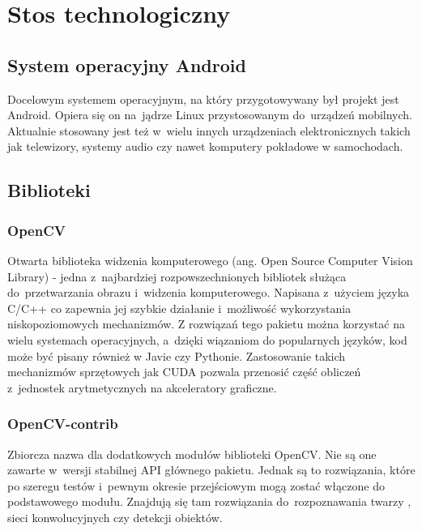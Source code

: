\newpage

\section{Stos technologiczny} \label{section:tech_stack}

\subsection{System operacyjny Android}

Docelowym systemem operacyjnym, na który przygotowywany był projekt jest Android. Opiera się on na~jądrze Linux przystosowanym do~urządzeń mobilnych. Aktualnie stosowany jest też w~wielu innych urządzeniach elektronicznych takich jak telewizory, systemy audio czy nawet komputery pokładowe w samochodach.  

\subsection{Biblioteki}

\subsubsection{OpenCV}

Otwarta biblioteka widzenia komputerowego (ang. Open Source Computer Vision Library) \cite{opencv} - jedna z~najbardziej rozpowszechnionych bibliotek służąca do~przetwarzania obrazu i~widzenia komputerowego. Napisana z~użyciem języka C/C++ co zapewnia jej szybkie działanie i~możliwość wykorzystania niskopoziomowych mechanizmów. Z rozwiązań tego pakietu można korzystać na wielu systemach operacyjnych, a~dzięki wiązaniom do popularnych języków, kod może być pisany również w Javie czy Pythonie. Zastosowanie takich mechanizmów sprzętowych jak CUDA \cite{nvidia_cuda} pozwala przenosić część obliczeń z~jednostek arytmetycznych na akceleratory graficzne.


\subsubsection{OpenCV-contrib} \label{section:opencv_contrib}

Zbiorcza nazwa dla dodatkowych modułów \cite{opencv_contrib} biblioteki OpenCV. Nie są one zawarte w~wersji stabilnej API głównego pakietu. Jednak są to rozwiązania, które po szeregu testów i~pewnym okresie przejściowym mogą zostać włączone do podstawowego modułu. Znajdują się tam rozwiązania do~rozpoznawania twarzy \cite{opencvcontribface}, sieci konwolucyjnych czy detekcji obiektów. 

